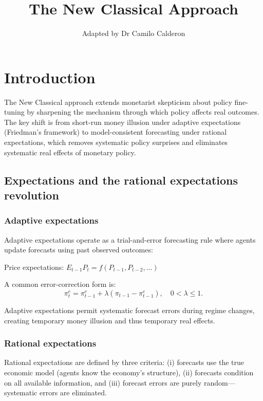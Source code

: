 \documentclass[
  letterpaper,
  DIV=11,
  numbers=noendperiod]{scrartcl}
\title{The New Classical Approach}
\author{Adapted by Dr Camilo Calderon}
\date{}
\renewcommand*\contentsname{Table of contents}
\newcommand\contentsname{Table of contents}
\begin{document}
\maketitle

\renewcommand*\contentsname{Table of contents}
{
\hypersetup{linkcolor=}
\setcounter{tocdepth}{3}
\tableofcontents
}

\section{Introduction}\label{introduction}

The New Classical approach extends monetarist skepticism about policy
fine-tuning by sharpening the mechanism through which policy affects
real outcomes. The key shift is from short-run money illusion under
adaptive expectations (Friedman's framework) to model-consistent
forecasting under rational expectations, which removes systematic policy
surprises and eliminates systematic real effects of monetary policy.

\subsection{Expectations and the rational expectations
revolution}\label{expectations-and-the-rational-expectations-revolution}

\subsubsection{Adaptive expectations}\label{adaptive-expectations}

Adaptive expectations operate as a trial-and-error forecasting rule
where agents update forecasts using past observed outcomes:

Price expectations: \(E_{t-1}P_t = f(P_{t-1}, P_{t-2}, ...)\)

A common error-correction form is:
\[\pi_t^e = \pi_{t-1}^e + \lambda(\pi_{t-1} - \pi_{t-1}^e), \quad 0 < \lambda \le 1.\]

Adaptive expectations permit systematic forecast errors during regime
changes, creating temporary money illusion and thus temporary real
effects.

\subsubsection{Rational expectations}\label{rational-expectations}

Rational expectations are defined by three criteria: (i) forecasts use
the true economic model (agents know the economy's structure), (ii)
forecasts condition on all available information, and (iii) forecast
errors are purely random---systematic errors are eliminated.
\end{document}
